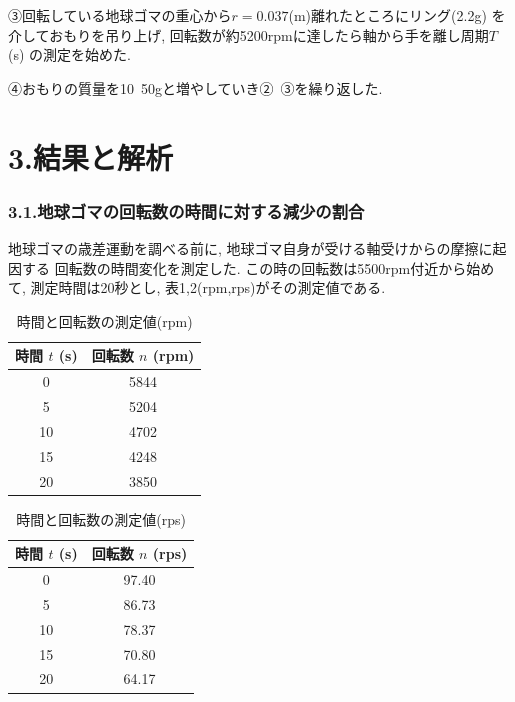 \documentclass{jlreq}
\begin{document}
③回転している地球ゴマの重心から$r = 0.037$(m)離れたところにリング(2.2g)
を介しておもりを吊り上げ, 回転数が約5200rpmに達したら軸から手を離し周期$T$(s)
の測定を始めた.\par

④おもりの質量を10~50gと増やしていき②~③を繰り返した.





\section*{3.結果と解析}

\subsubsection*{3.1.地球ゴマの回転数の時間に対する減少の割合}

地球ゴマの歳差運動を調べる前に, 地球ゴマ自身が受ける軸受けからの摩擦に起因する
回転数の時間変化を測定した. この時の回転数は5500rpm付近から始めて, 
測定時間は20秒とし, 表1,2(rpm,rps)がその測定値である.



\begin{table}[htbp]
  \centering
  \caption{時間と回転数の測定値(rpm)}
  \label{tab:rotation_decay}
  \begin{tabular}{|c|c|}
    \hline
    時間 $t$ (s) & 回転数 $n$ (rpm) \\ \hline
    0   & 5844 \\ \hline
    5   & 5204 \\ \hline
    10  & 4702 \\ \hline
    15  & 4248 \\ \hline
    20  & 3850 \\ \hline
  \end{tabular}
\end{table}



\begin{table}[htbp]
  \centering
  \caption{時間と回転数の測定値(rps)}
  \label{tab:rotation_decay_simple}
  \begin{tabular}{|c|c|}
    \hline
    時間 $t$ (s) & 回転数 $n$ (rps) \\ \hline
    0  & 97.40 \\ \hline
    5  & 86.73 \\ \hline
    10 & 78.37 \\ \hline
    15 & 70.80 \\ \hline
    20 & 64.17 \\ \hline
  \end{tabular}
\end{table}
\end{document}
